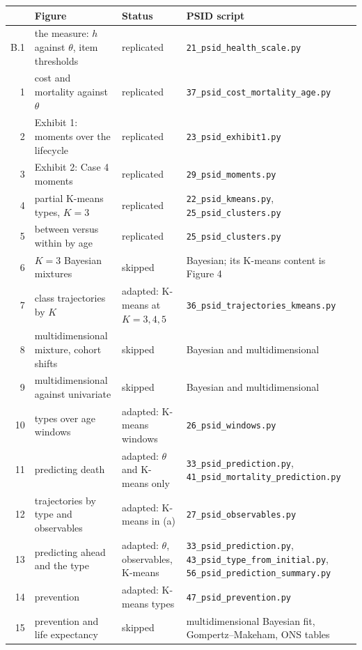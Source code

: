 \documentclass[11pt,a4paper]{article}
\begin{document}
\begin{center}\footnotesize
\begin{tabular}{r p{4.6cm} p{3.6cm} p{6.2cm}}
\toprule
& Figure & Status & PSID script \\
\midrule
B.1 & the measure: $h$ against $\theta$, item thresholds & replicated & \texttt{21\_psid\_health\_scale.py} \\
1 & cost and mortality against $\theta$ & replicated & \texttt{37\_psid\_cost\_mortality\_age.py} \\
2 & Exhibit 1: moments over the lifecycle & replicated & \texttt{23\_psid\_exhibit1.py} \\
3 & Exhibit 2: Case 4 moments & replicated & \texttt{29\_psid\_moments.py} \\
4 & partial K-means types, $K=3$ & replicated & \texttt{22\_psid\_kmeans.py}, \texttt{25\_psid\_clusters.py} \\
5 & between versus within by age & replicated & \texttt{25\_psid\_clusters.py} \\
6 & $K=3$ Bayesian mixtures & skipped & Bayesian; its K-means content is Figure 4 \\
7 & class trajectories by $K$ & adapted: K-means at $K=3,4,5$ & \texttt{36\_psid\_trajectories\_kmeans.py} \\
8 & multidimensional mixture, cohort shifts & skipped & Bayesian and multidimensional \\
9 & multidimensional against univariate & skipped & Bayesian and multidimensional \\
10 & types over age windows & adapted: K-means windows & \texttt{26\_psid\_windows.py} \\
11 & predicting death & adapted: $\theta$ and K-means only & \texttt{33\_psid\_prediction.py}, \texttt{41\_psid\_mortality\_prediction.py} \\
12 & trajectories by type and observables & adapted: K-means in (a) & \texttt{27\_psid\_observables.py} \\
13 & predicting ahead and the type & adapted: $\theta$, observables, K-means & \texttt{33\_psid\_prediction.py}, \texttt{43\_psid\_type\_from\_initial.py}, \texttt{56\_psid\_prediction\_summary.py} \\
14 & prevention & adapted: K-means types & \texttt{47\_psid\_prevention.py} \\
15 & prevention and life expectancy & skipped & multidimensional Bayesian fit, Gompertz--Makeham, ONS tables \\
\bottomrule
\end{tabular}
\end{center}
\end{document}
